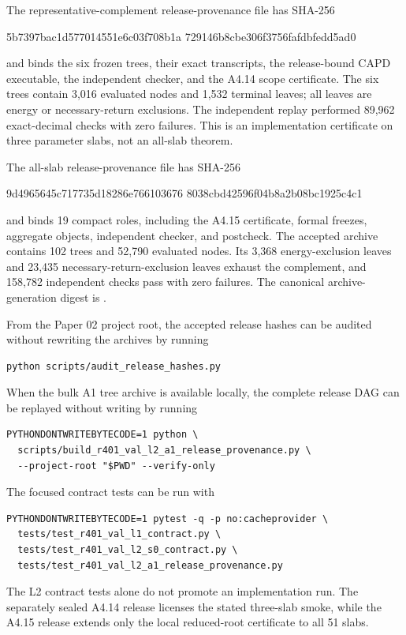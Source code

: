 The representative-complement release-provenance file has SHA-256
\begin{center}\small\ttfamily
5b7397ba\allowbreak{}c1d57701\allowbreak{}4551e6c0\allowbreak{}3f708b1a\allowbreak{}
729146b8\allowbreak{}cbe306f3\allowbreak{}756fafdb\allowbreak{}fedd5ad0
\end{center}
and binds the six frozen trees, their exact transcripts, the release-bound
CAPD executable, the independent checker, and the A4.14 scope certificate.
The six trees contain 3,016 evaluated nodes and 1,532 terminal leaves; all
leaves are energy or necessary-return exclusions.  The independent replay
performed 89,962 exact-decimal checks with zero failures.  This is an
implementation certificate on three parameter slabs, not an all-slab
theorem.

The all-slab release-provenance file has SHA-256
\begin{center}\small\ttfamily
9d496564\allowbreak{}5c717735\allowbreak{}d18286e7\allowbreak{}66103676\allowbreak{}
8038cbd4\allowbreak{}2596f04b\allowbreak{}8a2b08bc\allowbreak{}1925c4c1
\end{center}
and binds 19 compact roles, including the A4.15 certificate, formal freezes,
aggregate objects, independent checker, and postcheck.  The accepted archive
contains 102 trees and 52,790 evaluated nodes.  Its 3,368 energy-exclusion
leaves and 23,435 necessary-return-exclusion leaves exhaust the complement,
and 158,782 independent checks pass with zero failures.  The canonical
archive-generation digest is
.

From the Paper 02 project root, the accepted release hashes can be audited
without rewriting the archives by running
\begin{verbatim}
python scripts/audit_release_hashes.py
\end{verbatim}
When the bulk A1 tree archive is available locally, the complete release DAG
can be replayed without writing by running
\begin{verbatim}
PYTHONDONTWRITEBYTECODE=1 python \
  scripts/build_r401_val_l2_a1_release_provenance.py \
  --project-root "$PWD" --verify-only
\end{verbatim}
The focused contract tests can be run with
\begin{verbatim}
PYTHONDONTWRITEBYTECODE=1 pytest -q -p no:cacheprovider \
  tests/test_r401_val_l1_contract.py \
  tests/test_r401_val_l2_s0_contract.py \
  tests/test_r401_val_l2_a1_release_provenance.py
\end{verbatim}
The L2 contract tests alone do not promote an implementation run.  The
separately sealed A4.14 release licenses the stated three-slab smoke, while
the A4.15 release extends only the local reduced-root certificate to all 51
slabs.

